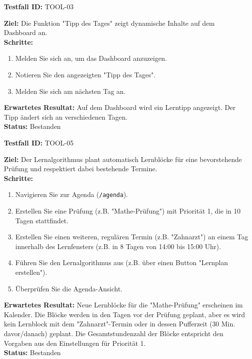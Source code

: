 \documentclass[11pt, a4paper]{article}
\newenvironment{testcase}[1]{%
    \par\vspace{1em}\noindent\begin{minipage}{\linewidth}
    \textbf{Testfall ID:} #1 \\
    \vspace{0.2em}
}{\end{minipage}\par\vspace{1em}}
\begin{document}
\begin{testcase}{TOOL-03}
    \textbf{Ziel:} Die Funktion "Tipp des Tages" zeigt dynamische Inhalte auf dem Dashboard an.\\
    \textbf{Schritte:}
    \begin{enumerate}[label=\arabic*.]
        \item Melden Sie sich an, um das Dashboard anzuzeigen.
        \item Notieren Sie den angezeigten "Tipp des Tages".
        \item Melden Sie sich am nächsten Tag an.
    \end{enumerate}
    \textbf{Erwartetes Resultat:} Auf dem Dashboard wird ein Lerntipp angezeigt. Der Tipp ändert sich an verschiedenen Tagen.\\
    \vspace{0.5em}\textbf{Status:} \textcolor{passcolor}{Bestanden}
\end{testcase}

\begin{testcase}{TOOL-05}
    \textbf{Ziel:} Der Lernalgorithmus plant automatisch Lernblöcke für eine bevorstehende Prüfung und respektiert dabei bestehende Termine.\\
    \textbf{Schritte:}
    \begin{enumerate}[label=\arabic*.]
        \item Navigieren Sie zur Agenda (\texttt{/agenda}).
        \item Erstellen Sie eine Prüfung (z.B. "Mathe-Prüfung") mit Priorität 1, die in 10 Tagen stattfindet.
        \item Erstellen Sie einen weiteren, regulären Termin (z.B. "Zahnarzt") an einem Tag innerhalb des Lernfensters (z.B. in 8 Tagen von 14:00 bis 15:00 Uhr).
        \item Führen Sie den Lernalgorithmus aus (z.B. über einen Button "Lernplan erstellen").
        \item Überprüfen Sie die Agenda-Ansicht.
    \end{enumerate}
    \textbf{Erwartetes Resultat:} Neue Lernblöcke für die "Mathe-Prüfung" erscheinen im Kalender. Die Blöcke werden in den Tagen vor der Prüfung geplant, aber es wird kein Lernblock mit dem "Zahnarzt"-Termin oder in dessen Pufferzeit (30 Min. davor/danach) geplant. Die Gesamtstundenzahl der Blöcke entspricht den Vorgaben aus den Einstellungen für Priorität 1.\\
    \vspace{0.5em}\textbf{Status:} \textcolor{passcolor}{Bestanden}
\end{testcase}
\end{document}
